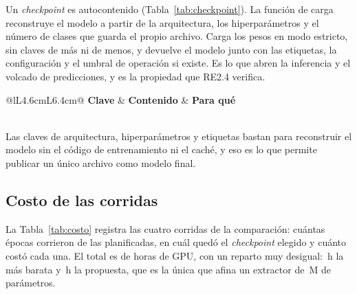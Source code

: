 Un \textit{checkpoint} es autocontenido (Tabla~\ref{tab:checkpoint}). La
función de carga reconstruye el modelo a partir de la arquitectura, los
hiperparámetros y el número de clases que guarda el propio archivo. Carga los
pesos en modo estricto, sin claves de más ni de menos, y devuelve el modelo junto
con las etiquetas, la configuración y el umbral de operación si existe. Es lo que
abren la inferencia y el volcado de predicciones, y es la propiedad que RE2.4
verifica.

\begin{table}[htbp]
    \centering
    \small
    \caption{Claves de un checkpoint}
    \label{tab:checkpoint}
    \begin{tabular}{@{}lL{4.6cm}L{6.4cm}@{}}
        \toprule
        \textbf{Clave} & \textbf{Contenido} & \textbf{Para qué} \\
        \midrule
         \\
        \bottomrule
    \end{tabular}
\end{table}

Las claves de arquitectura, hiperparámetros y etiquetas bastan para reconstruir el
modelo sin el código de entrenamiento ni el caché, y eso es lo que permite
publicar un único archivo como modelo final.

\subsection{Costo de las corridas}

La Tabla~\ref{tab:costo} registra las cuatro corridas de la comparación: cuántas
épocas corrieron de las planificadas, en cuál quedó el \textit{checkpoint}
elegido y cuánto costó cada una. El total es de \cHoursTotal{} horas de GPU, con
un reparto muy desigual: \cHoursYol{}\,h la más barata y \cHoursDet{}\,h la
propuesta, que es la única que afina un extractor de \cParamsDet{}\,M de
parámetros.

